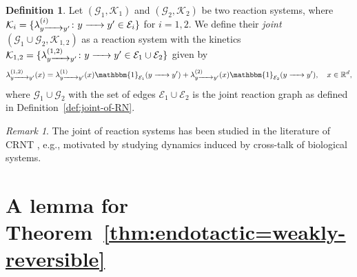 \documentclass[10pt]{amsart}
\numberwithin{equation}{section}
\theoremstyle{plain}
\theoremstyle{definition}
\newtheorem{definition}[theorem]{Definition}
\theoremstyle{remark}
\newtheorem{remark}[theorem]{Remark}
\newcommand{\cE}{\mathcal{E}}
\newcommand{\cG}{\mathcal{G}}
\newcommand{\cK}{\mathcal{K}}
\begin{document}
\begin{definition}\label{def:joint-of-KRN}
Let $(\cG_1,\mathcal{K}_1)$ and $(\cG_2,\mathcal{K}_2)$ be two reaction systems, where $\mathcal{K}_i=\{\lambda^{(i)}_{y\ce{->[]} y'}\colon y\ce{->[]} y'\in\mathcal{E}_i\}$ for $i=1,2$. We define their \emph{joint} $(\cG_1\cup\cG_2,\cK_{1,2})$ as a reaction system with the kinetics $\cK_{1,2}=\{\lambda_{y\ce{->[]} y'}^{(1,2)}\colon y\ce{->[]} y'\in\cE_1\cup\cE_2\}$ given by
$$\lambda^{(1,2)}_{y\ce{->[]} y'}(x)=\lambda^{(1)}_{y\ce{->[]} y'}(x)\mathbbm{1}_{\cE_1}(y\ce{->[]} y') +\lambda^{(2)}_{y\ce{->[]} y'}(x)\mathbbm{1}_{\cE_2}(y\ce{->[]} y'),\quad x\in\mathbb{R}^d,$$  where $\cG_1\cup\cG_2$ with the set of edges $\cE_1\cup\cE_2$
is the joint reaction graph as defined in Definition~\ref{def:joint-of-RN}.
\end{definition}
 \begin{remark}
The joint of reaction systems has been studied in the  literature of CRNT  \cite{GHMS20}, e.g., motivated by studying dynamics induced by cross-talk of biological systems.
 \end{remark}

\section{A lemma for Theorem~\ref{thm:endotactic=weakly-reversible}}
\end{document}
